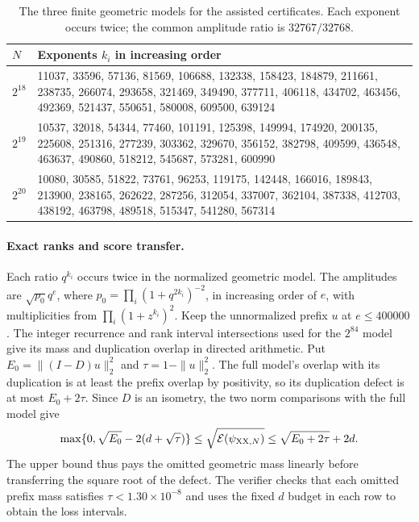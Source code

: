 \begin{table}[htb]
\centering\footnotesize
\begin{tabular}{@{}lp{13cm}@{}}
\toprule
$N$ & Exponents $k_i$ in increasing order \\
\midrule
$2^{18}$ & 11037, 33596, 57136, 81569, 106688, 132338, 158423, 184879, 211661, 238735, 266074, 293658, 321469, 349490, 377711, 406118, 434702, 463456, 492369, 521437, 550651, 580008, 609500, 639124 \\
$2^{19}$ & 10537, 32018, 54344, 77460, 101191, 125398, 149994, 174920, 200135, 225608, 251316, 277239, 303362, 329670, 356152, 382798, 409599, 436548, 463637, 490860, 518212, 545687, 573281, 600990 \\
$2^{20}$ & 10080, 30585, 51822, 73761, 96253, 119175, 142448, 166016, 189843, 213900, 238165, 262622, 287256, 312054, 337007, 362104, 387338, 412703, 438192, 463798, 489518, 515347, 541280, 567314 \\
\bottomrule
\end{tabular}
\caption{The three finite geometric models for the assisted certificates. Each exponent occurs twice; the common amplitude ratio is $32767/32768$.}
\label{tab:xx-assisted-exponents}
\end{table}

\paragraph{Exact ranks and score transfer.}
Each ratio \(q^{k_i}\) occurs twice in the normalized geometric model.
The amplitudes are \(\sqrt{p_0}q^e\), where
\(p_0=\prod_i(1+q^{2k_i})^{-2}\), in increasing order of \(e\), with
multiplicities from \(\prod_i(1+z^{k_i})^2\).
Keep the unnormalized prefix \(u\) at \(e\le400000\). The integer
recurrence and rank interval intersections used for the \(2^{84}\)
model give its mass and duplication overlap in directed arithmetic.
Put \(E_0=\|(I-D)u\|_2^2\) and \(\tau=1-\|u\|_2^2\).
The full model's overlap with its duplication is at least the prefix
overlap by positivity, so its duplication defect is at most
\(E_0+2\tau\). Since \(D\) is an isometry, the two norm comparisons
with the full model give
\[
 \max\{0,\sqrt{E_0}-2(d+\sqrt{\tau})\}
 \le \sqrt{\mathcal{E}(\psi_{\mathrm{XX},N})}
 \le \sqrt{E_0+2\tau}+2d.
\]
The upper bound thus pays the omitted geometric mass linearly before
transferring the square root of the defect. The verifier checks that each
omitted prefix mass satisfies \(\tau<1.30\times10^{-8}\) and uses the fixed
\(d\) budget in each row to obtain the loss intervals.

